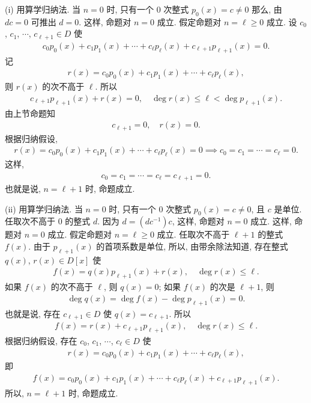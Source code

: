\begin{pf}
    (i) 用算学归纳法. 当 $n=0$ 时, 只有一个 $0$ 次整式 $p_0 (x) = c \neq 0$ 那么, 由 $dc = 0$ 可推出 $d = 0$. 这样, 命题对 $n=0$ 成立. 假定命题对 $n = \ell \geq 0$ 成立. 设 $c_0$, $c_1$, $\cdots$, $c_{\ell + 1} \in D$ 使
    \begin{align*}
        c_0 p_0 (x) + c_1 p_1 (x) + \cdots + c_{\ell} p_{\ell} (x) + c_{\ell + 1} p_{\ell + 1} (x) = 0.
    \end{align*}
    记
    \begin{align*}
        r(x) = c_0 p_0 (x) + c_1 p_1 (x) + \cdots + c_{\ell} p_{\ell} (x),
    \end{align*}
    则 $r(x)$ 的次不高于 $\ell$. 所以
    \begin{align*}
        c_{\ell + 1} p_{\ell + 1} (x) + r(x) = 0, \quad \deg r(x) \leq \ell < \deg p_{\ell + 1} (x).
    \end{align*}
    由上节命题知
    \begin{align*}
        c_{\ell + 1} = 0, \quad r(x) = 0.
    \end{align*}
    根据归纳假设,
    \begin{align*}
        r(x) = c_0 p_0 (x) + c_1 p_1 (x) + \cdots + c_{\ell} p_{\ell} (x) = 0 \implies c_0 = c_1 = \cdots = c_{\ell} = 0.
    \end{align*}
    这样,
    \begin{align*}
        c_0 = c_1 = \cdots = c_{\ell} = c_{\ell + 1} = 0.
    \end{align*}
    也就是说, $n=\ell + 1$ 时, 命题成立.

    (ii) 用算学归纳法. 当 $n=0$ 时, 只有一个 $0$ 次整式 $p_0 (x) = c \neq 0$, 且 $c$ 是单位. 任取次不高于 $0$ 的整式 $d$. 因为 $d = (dc^{-1})c$, 这样, 命题对 $n=0$ 成立. 这样, 命题对 $n=0$ 成立. 假定命题对 $n = \ell \geq 0$ 成立. 任取次不高于 $\ell + 1$ 的整式 $f(x)$. 由于 $p_{\ell + 1} (x)$ 的首项系数是单位, 所以, 由带余除法知道, 存在整式 $q(x)$, $r(x) \in D[x]$ 使
    \begin{align*}
        f(x) = q(x) p_{\ell + 1} (x) + r(x), \quad \deg r(x) \leq \ell.
    \end{align*}
    如果 $f(x)$ 的次不高于 $\ell$, 则 $q(x) = 0$; 如果 $f(x)$ 的次是 $\ell + 1$, 则
    \begin{align*}
        \deg q(x) = \deg f(x) - \deg p_{\ell+1} (x) = 0.
    \end{align*}
    也就是说, 存在 $c_{\ell + 1} \in D$ 使 $q(x) = c_{\ell + 1}$. 所以
    \begin{align*}
        f(x) = r(x) + c_{\ell + 1} p_{\ell + 1} (x), \quad \deg r(x) \leq \ell.
    \end{align*}
    根据归纳假设, 存在 $c_0$, $c_1$, $\cdots$, $c_{\ell} \in D$ 使
    \begin{align*}
        r(x) = c_0 p_0 (x) + c_1 p_1 (x) + \cdots + c_{\ell} p_{\ell} (x),
    \end{align*}
    即
    \begin{align*}
        f(x) = c_0 p_0 (x) + c_1 p_1 (x) + \cdots + c_{\ell} p_{\ell} (x) + c_{\ell + 1} p_{\ell + 1} (x).
    \end{align*}
    所以, $n = \ell + 1$ 时, 命题成立.
\end{pf}

